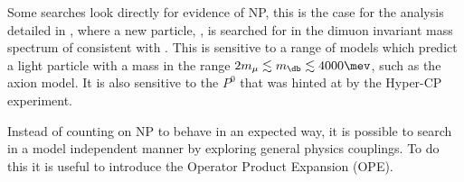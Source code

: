 Some searches look directly for evidence of NP, this is the case for the analysis detailed in
, where a new particle, \db, is searched for in the dimuon invariant mass spectrum of
\decay{\Bd}{\Kstarent\mumu} consistent with \decay{\db}{\mumu}.
This is sensitive to a range of models which predict a light particle with a mass in the range
$2m_\mu\lesssim m_\db\lesssim4000\mev$, such as the axion model.
It is also sensitive to the $P^0$ that was hinted at by the Hyper-CP experiment.

Instead of counting on NP to behave in an expected way, it is possible to search in a model
independent manner by exploring general physics couplings.
To do this it is useful to introduce the Operator Product Expansion (OPE).



